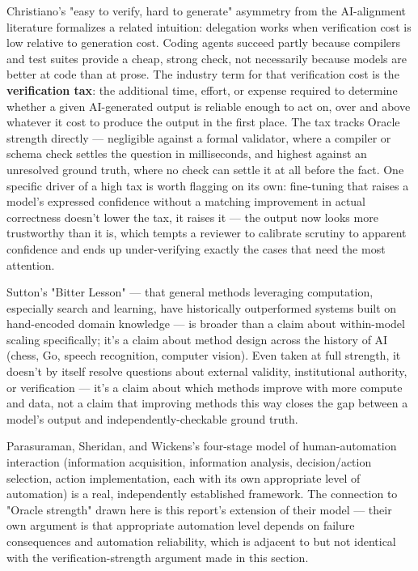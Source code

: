 Christiano's "easy to verify, hard to generate" asymmetry from the AI-alignment literature formalizes a related intuition: delegation works when verification cost is low relative to generation cost. Coding agents succeed partly because compilers and test suites provide a cheap, strong check, not necessarily because models are better at code than at prose. The industry term for that verification cost is the \textbf{verification tax}: the additional time, effort, or expense required to determine whether a given AI-generated output is reliable enough to act on, over and above whatever it cost to produce the output in the first place. The tax tracks Oracle strength directly --- negligible against a formal validator, where a compiler or schema check settles the question in milliseconds, and highest against an unresolved ground truth, where no check can settle it at all before the fact. One specific driver of a high tax is worth flagging on its own: fine-tuning that raises a model's expressed confidence without a matching improvement in actual correctness doesn't lower the tax, it raises it --- the output now looks more trustworthy than it is, which tempts a reviewer to calibrate scrutiny to apparent confidence and ends up under-verifying exactly the cases that need the most attention.

Sutton's "Bitter Lesson" --- that general methods leveraging computation, especially search and learning, have historically outperformed systems built on hand-encoded domain knowledge --- is broader than a claim about within-model scaling specifically; it's a claim about method design across the history of AI (chess, Go, speech recognition, computer vision). Even taken at full strength, it doesn't by itself resolve questions about external validity, institutional authority, or verification --- it's a claim about which methods improve with more compute and data, not a claim that improving methods this way closes the gap between a model's output and independently-checkable ground truth.

Parasuraman, Sheridan, and Wickens's four-stage model of human-automation interaction (information acquisition, information analysis, decision/action selection, action implementation, each with its own appropriate level of automation) is a real, independently established framework. The connection to "Oracle strength" drawn here is this report's extension of their model --- their own argument is that appropriate automation level depends on failure consequences and automation reliability, which is adjacent to but not identical with the verification-strength argument made in this section.

